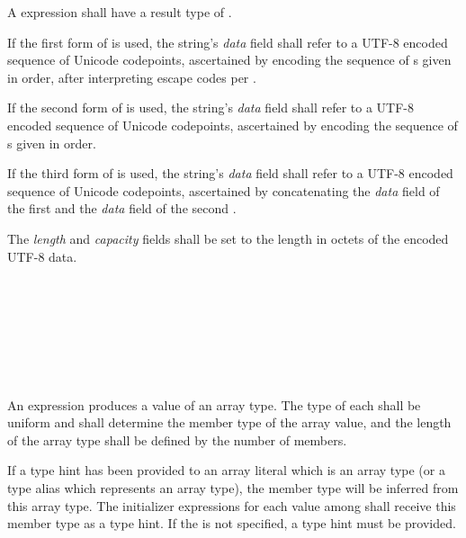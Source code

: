\specsubsubitem
A  expression shall have a result type of
 .

\specsubsubitem
If the first form of  is used, the string's
\textit{data} field shall refer to a UTF-8 encoded sequence of Unicode
codepoints, ascertained by encoding the sequence of s
given in order, after interpreting escape codes per
.

\specsubsubitem
If the second form of  is used, the string's
\textit{data} field shall refer to a UTF-8 encoded sequence of Unicode
codepoints, ascertained by encoding the sequence of
s given in order.

\specsubsubitem
If the third form of  is used, the string's
\textit{data} field shall refer to a UTF-8 encoded sequence of Unicode
codepoints, ascertained by concatenating the \textit{data} field of the first
 and the \textit{data} field of the second
.

\specsubsubitem
The \textit{length} and \textit{capacity} fields shall be set to the length in
octets of the encoded UTF-8 data.


\begin{grammar}
 \\
	\terminal{[}  \terminal{]} \\

 \\
	 \optional{\terminal{,}} \\
	  \optional{\terminal{,}} \\
	 \terminal{,}  \\
\end{grammar}

\specsubsubitem
An  expression produces a value of an array type.
The type of each  shall be uniform and shall
determine the member type of the array value, and the length of the array type
shall be defined by the number of members.

\specsubsubitem
If a type hint has been provided to an array literal which is an array type (or
a type alias which represents an array type), the member type will be inferred
from this array type. The initializer expressions for each value among
 shall receive this member type as a type hint. If
the  is not specified, a type hint must be provided.

